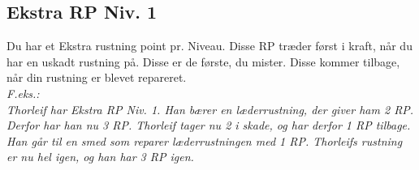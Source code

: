 \subsection*{Ekstra RP Niv. 1}
Du har et Ekstra rustning point pr. Niveau. Disse RP træder først i kraft, når du har en uskadt rustning på. Disse er de første, du mister. Disse kommer tilbage, når din rustning er blevet repareret.\\
\textit{F.eks.:\\
Thorleif har Ekstra RP Niv. 1. Han bærer en læderrustning, der giver ham 2 RP.
Derfor har han nu 3 RP. Thorleif tager nu 2 i skade, og har derfor 1 RP tilbage.
Han går til en smed som reparer læderrustningen med 1 RP. Thorleifs rustning er
nu hel igen, og han har 3 RP igen.}\\